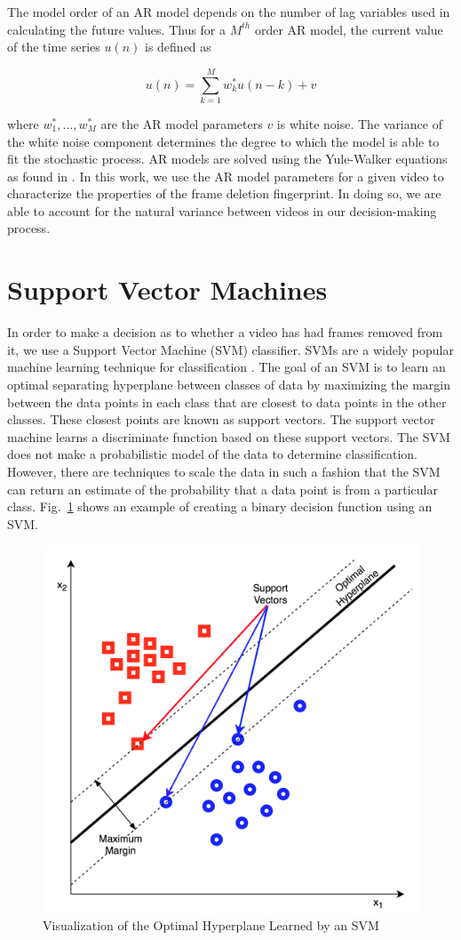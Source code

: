 The model order of an AR model depends on the number of lag variables used in calculating the future values. Thus for a $M^{th}$ order AR model, the current value of the time series $u(n)$ is defined as

\begin{equation}
u(n) = \sum_{k = 1}^{M} w^{*}_{k} u(n-k) + v
\end{equation}

where $w^{*}_{1}, \dots, w^{*}_{M}$ are the AR model parameters $v$ is white noise. The variance of the white noise component determines the degree to which the model is able to fit the stochastic process. AR models are solved using the Yule-Walker equations as found in \cite{ARmodels}. In this work, we use the AR model parameters for a given video to characterize the properties of the frame deletion fingerprint. In doing so, we are able to account for the natural variance between videos in our decision-making process.

\section{Support Vector Machines}

In order to make a decision as to whether a video has had frames removed from it, we use a Support Vector Machine (SVM) classifier. SVMs are a widely popular machine learning technique for classification \cite{svm}. The goal of an SVM is to learn an optimal separating hyperplane between classes of data by maximizing the margin between the data points in each class that are closest to data points in the other classes. These closest points are known as support vectors. The support vector machine learns a discriminate function based on these support vectors. The SVM does not make a probabilistic model of the data to determine classification. However, there are techniques \cite{plattscaling} to scale the data in such a fashion that the SVM can return an estimate of the probability that a data point is from a particular class. Fig.~\ref{svmvis} shows an example of creating a binary decision function  using an SVM.

\begin{figure}[htbp]
\centerline{\includegraphics[width=0.7\linewidth]{Background/svm_vis.png}}
\caption{Visualization of the Optimal Hyperplane Learned by an SVM }
\label{svmvis}
\end{figure}

